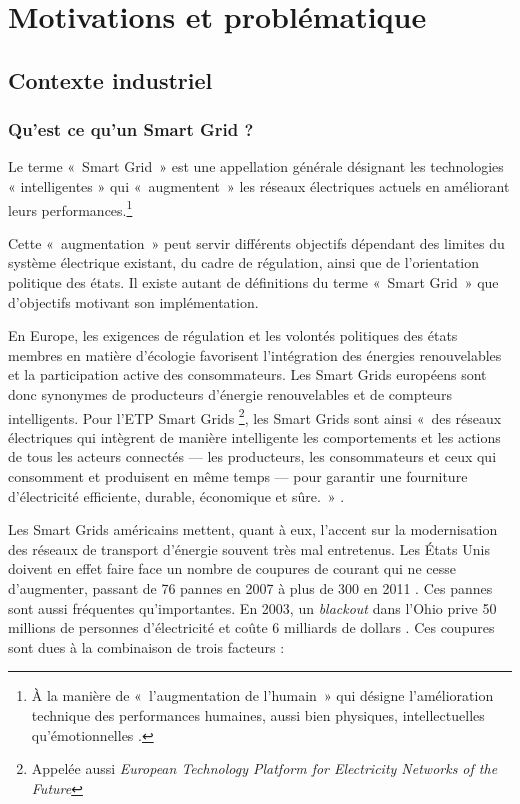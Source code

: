 \chapter{Motivations et problématique}
\label{ch:problematique}

\section{Contexte industriel}

\subsection{Qu'est ce qu'un Smart Grid ?}
Le terme «~Smart Grid~» est une appellation générale désignant les technologies 
« intelligentes » qui «~augmentent~» les réseaux électriques actuels en 
améliorant leurs performances.\footnote{À la manière de «~l'augmentation de 
l'humain~» qui désigne l'amélioration technique des performances humaines, aussi 
bien physiques, intellectuelles qu'émotionnelles \cite{le2013humain}.}

Cette «~augmentation~» peut servir différents objectifs dépendant des limites du 
système électrique existant, du cadre de régulation, ainsi que de 
l'orientation politique des états. Il existe autant de définitions du terme 
«~Smart Grid~» que d'objectifs motivant son implémentation. 


En Europe, les exigences de régulation et les volontés politiques des états 
membres en matière d'écologie favorisent l'intégration 
des énergies renouvelables et la participation active des consommateurs. Les 
Smart Grids européens sont donc synonymes de producteurs d'énergie renouvelables 
et de compteurs intelligents. Pour l'ETP Smart Grids \footnote{Appelée aussi 
\textit{European Technology Platform for Electricity Networks of the Future}}, 
les Smart Grids sont ainsi «~des réseaux électriques qui intègrent de manière 
intelligente les comportements et les actions de tous les acteurs connectés — 
les producteurs, les consommateurs et ceux qui consomment et produisent en même 
temps — pour garantir une fourniture d'électricité efficiente, durable, 
économique et sûre.~» \cite{ETP}.

Les Smart Grids américains mettent, quant à eux, l'accent sur la modernisation 
des réseaux de transport d'énergie souvent très mal entretenus. Les États Unis 
doivent en effet faire face un nombre de 
coupures de courant qui ne cesse d'augmenter, passant de 76 pannes en 2007 à 
plus de 300 en 2011 \cite{detroit}. Ces pannes sont aussi fréquentes 
qu'importantes. En 2003, un \textit{blackout} dans l'Ohio prive 50 millions de 
personnes d'électricité et coûte 6 milliards de dollars 
\cite{andersson2005causes}. Ces coupures sont dues à la 
combinaison de trois facteurs \cite{outages}:

